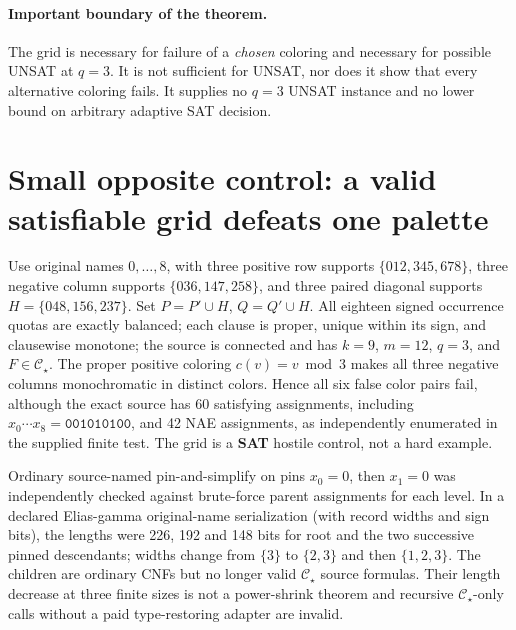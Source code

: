 \documentclass[11pt]{article}
\newcommand{\CS}{\mathcal C_\star}
\begin{document}
\paragraph{Important boundary of the theorem.}
The grid is necessary for failure of a \emph{chosen} coloring and
necessary for possible UNSAT at $q=3$. It is not sufficient for
UNSAT, nor does it show that every alternative coloring fails.
It supplies no $q=3$ UNSAT instance and no lower bound on
arbitrary adaptive SAT decision.

\section{Small opposite control: a valid satisfiable grid defeats one palette}
Use original names $0,\ldots,8$, with three positive row supports
$\{012,345,678\}$, three negative column supports
$\{036,147,258\}$, and three paired diagonal supports
$H=\{048,156,237\}$. Set $P=P'\cup H$, $Q=Q'\cup H$.
All eighteen signed occurrence quotas are exactly balanced;
each clause is proper, unique within its sign, and clausewise
monotone; the source is connected and has $k=9$, $m=12$,
$q=3$, and $F\in\CS$.
The proper positive coloring $c(v)=v\bmod3$ makes all three
negative columns monochromatic in distinct colors. Hence
all six false color pairs fail, although the exact source has
60 satisfying assignments, including
$x_0\cdots x_8=\texttt{001010100}$, and 42 NAE assignments,
as independently enumerated in the supplied finite test.
The grid is a \textbf{SAT} hostile control, not a hard example.

Ordinary source-named pin-and-simplify on pins $x_0=0$,
then $x_1=0$ was independently checked against brute-force
parent assignments for each level. In a declared Elias-gamma
original-name serialization (with record widths and sign bits),
the lengths were 226, 192 and 148 bits for root and the two
successive pinned descendants; widths change from $\{3\}$ to
$\{2,3\}$ and then $\{1,2,3\}$. The children are ordinary
CNFs but no longer valid $\CS$ source formulas. Their length
decrease at three finite sizes is not a power-shrink theorem
and recursive $\CS$-only calls without a paid type-restoring
adapter are invalid.
\end{document}
